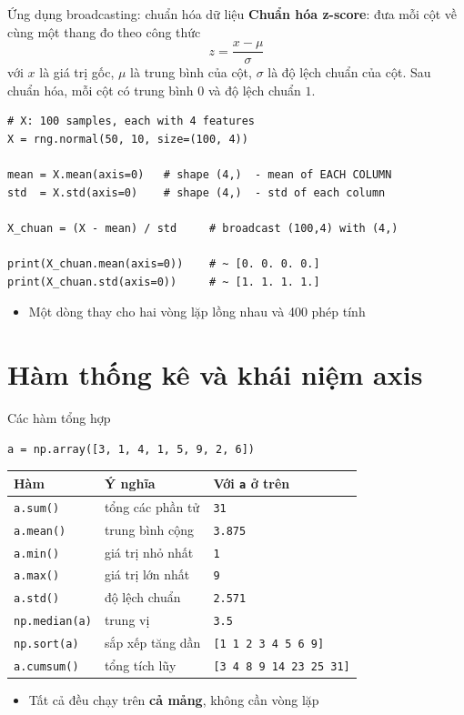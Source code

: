 \documentclass[11pt]{beamer}
\begin{document}
\begin{frame}[fragile]{Ứng dụng broadcasting: chuẩn hóa dữ liệu}
\textbf{Chuẩn hóa z-score}: đưa mỗi cột về cùng một thang đo theo công thức
\[
  z = \frac{x - \mu}{\sigma}
\]
với $x$ là giá trị gốc, $\mu$ là trung bình của cột, $\sigma$ là độ lệch chuẩn của cột.
Sau chuẩn hóa, mỗi cột có trung bình $0$ và độ lệch chuẩn $1$.
\begin{lstlisting}
# X: 100 samples, each with 4 features
X = rng.normal(50, 10, size=(100, 4))

mean = X.mean(axis=0)   # shape (4,)  - mean of EACH COLUMN
std  = X.std(axis=0)    # shape (4,)  - std of each column

X_chuan = (X - mean) / std     # broadcast (100,4) with (4,)

print(X_chuan.mean(axis=0))    # ~ [0. 0. 0. 0.]
print(X_chuan.std(axis=0))     # ~ [1. 1. 1. 1.]
\end{lstlisting}
\begin{itemize}
  \item Một dòng thay cho hai vòng lặp lồng nhau và 400 phép tính
\end{itemize}
\end{frame}

\section{Hàm thống kê và khái niệm axis}

\begin{frame}[fragile]{Các hàm tổng hợp}
\begin{lstlisting}
a = np.array([3, 1, 4, 1, 5, 9, 2, 6])
\end{lstlisting}
\begin{center}
\small
\begin{tabular}{|l|l|l|}
\hline
\textbf{Hàm} & \textbf{Ý nghĩa} & \textbf{Với \texttt{a} ở trên} \\
\hline
\texttt{a.sum()}      & tổng các phần tử      & \texttt{31} \\
\texttt{a.mean()}     & trung bình cộng       & \texttt{3.875} \\
\texttt{a.min()}      & giá trị nhỏ nhất      & \texttt{1} \\
\texttt{a.max()}      & giá trị lớn nhất      & \texttt{9} \\
\texttt{a.std()}      & độ lệch chuẩn         & \texttt{2.571} \\
\texttt{np.median(a)} & trung vị              & \texttt{3.5} \\
\texttt{np.sort(a)}   & sắp xếp tăng dần      & \texttt{[1 1 2 3 4 5 6 9]} \\
\texttt{a.cumsum()}   & tổng tích lũy         & \texttt{[3 4 8 9 14 23 25 31]} \\
\hline
\end{tabular}
\end{center}
\begin{itemize}
  \item Tất cả đều chạy trên \textbf{cả mảng}, không cần vòng lặp
\end{itemize}
\end{frame}
\end{document}
